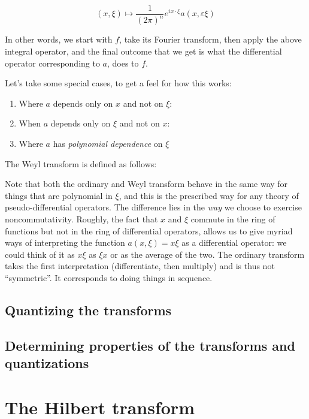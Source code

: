 \documentclass[a4paper]{amsart}
\begin{document}
$$(x,\xi) \mapsto \frac{1}{(2\pi)^n} e^{ix \cdot \xi} a(x,\varepsilon \xi)$$

In other words, we start with $f$, take its Fourier transform, then
apply the above integral operator, and the final outcome that we get
is what the differential operator corresponding to $a$, does to $f$.

Let's take some special cases, to get a feel for how this works:

\begin{enumerate}

\item Where $a$ depends only on $x$ and not on $\xi$:

\item When $a$ depends only on $\xi$ and not on $x$:
\item Where $a$ has {\em polynomial dependence} on $\xi$ 

\end{enumerate}

The Weyl transform is defined as follows:


Note that both the ordinary and Weyl transform behave in the same
way for things that are polynomial in $\xi$, and this is the
prescribed way for any theory of pseudo-differential operators. The
difference lies in the {\em way} we choose to exercise
noncommutativity. Roughly, the fact that $x$ and $\xi$ commute in the
ring of functions but not in the ring of differential operators,
allows us to give myriad ways of interpreting the function $a(x,\xi) =
x\xi$ as a differential operator: we could think of it as $x\xi$ as
$\xi x$ or as the average of the two. The ordinary transform takes the
first interpretation (differentiate, then multiply) and is thus not
``symmetric''. It corresponds to doing things in sequence. 

\subsection{Quantizing the transforms}

\subsection{Determining properties of the transforms and quantizations}

\section{The Hilbert transform}






\printindex
\end{document}
